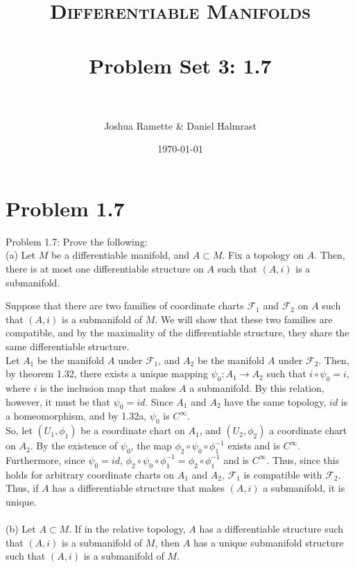 \documentclass[paper=a4, fontsize=11pt]{scrartcl} %
\title{    
\normalfont \normalsize 
\textsc{Differentiable Manifolds} \\ [25pt] %
\horrule{0.5pt} \\[0.4cm] %
\huge Problem Set 3: 1.7 \\ %
\horrule{2pt} \\[0.5cm] %
}
\author{Joshua Ramette \& Daniel Halmrast} %
\date{\normalsize\today} %
\numberwithin{equation}{section} %
\numberwithin{figure}{section} %
\numberwithin{table}{section} %
\begin{document}
\maketitle %


\section*{Problem 1.7}
Problem 1.7: Prove the following: \\
(a) Let $M$ be a differentiable manifold, and $A \subset M$. Fix a topology on $A$. Then, there is at most one differentiable structure on $A$ such that $(A,i)$ is a submanifold.

Suppose that there are two families of coordinate charts $\mathscr{F}_1$ and $\mathscr{F}_2$ on $A$ such that $(A,i)$ is a submanifold of $M$. We will show that these two families are compatible, and by the maximality of the differentiable structure, they share the same differentiable structure. \\

Let $A_1$ be the manifold $A$ under $\mathscr{F}_1$, and $A_2$ be the manifold $A$ under $\mathscr{F}_2$. 
Then, by theorem 1.32, there exists a unique mapping $\psi_0 : A_1 \to A_2$ such that $i\circ \psi_0 = i$, 
where $i$ is the inclusion map that makes $A$ a submanifold. 
By this relation, however, it must be that $\psi_0 = id$. 
Since $A_1$ and $A_2$ have the same topology, $id$ is a homeomorphism, and by 1.32a, $\psi_0$ is $C^{\infty}$. \\
So, let $(U_1, \phi_1)$ be a coordinate chart on $A_1$, and $(U_2, \phi_2)$ a coordinate chart on $A_2$. 
By the existence of $\psi_0$, the map $\phi_2\circ\psi_0\circ\phi_1^{-1}$ exists and is $C^{\infty}$. 
Furthermore, since $\psi_0 = id$, $\phi_2\circ\psi_0\circ\phi_1^{-1} = \phi_2\circ\phi_1^{-1}$ and is $C^{\infty}$. 
Thus, since this holds for arbitrary coordinate charts on $A_1$ and $A_2$, $\mathscr{F}_1$ is compatible with $\mathscr{F}_2$. \\

Thus, if $A$ has a differentiable structure that makes $(A,i)$ a submanifold, it is unique. 
\\
\\

(b) Let $A \subset M$. If in the relative topology, $A$ has a differentiable structure such that $(A,i)$ is a submanifold of $M$, then $A$ has a unique submanifold structure such that $(A,i)$ is a submanifold of $M$.
\end{document}
